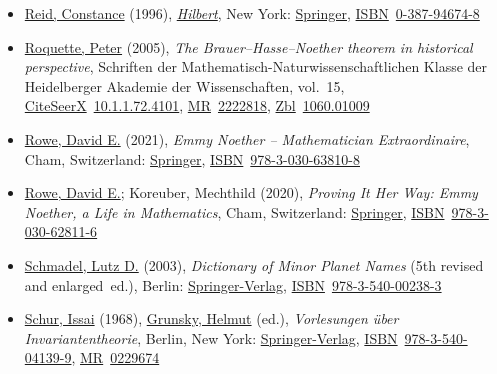 \begin{itemize}
\item
  \href{https://en.wikipedia.org/wiki/Constance_Reid}{Reid, Constance} (1996), \href{https://books.google.com/books?id=mR4SdJGD7tEC}{\emph{Hilbert}}, New York: \href{https://en.wikipedia.org/wiki/Springer_Publishing}{Springer}, \href{https://en.wikipedia.org/wiki/ISBN_(identifier)}{ISBN}{~}\href{https://en.wikipedia.org/wiki/Special:BookSources/0-387-94674-8}{0-387-94674-8}{}
\item
  \href{https://en.wikipedia.org/wiki/Peter_Roquette}{Roquette, Peter} (2005), \emph{The Brauer--Hasse--Noether theorem in historical perspective}, Schriften der Mathematisch-Naturwissenschaftlichen Klasse der Heidelberger Akademie der Wissenschaften, vol.{~}15, \href{https://en.wikipedia.org/wiki/CiteSeerX_(identifier)}{CiteSeerX}{~}{\href{https://citeseerx.ist.psu.edu/viewdoc/summary?doi=10.1.1.72.4101}{10.1.1.72.4101}}, \href{https://en.wikipedia.org/wiki/MR_(identifier)}{MR}{~}\href{https://mathscinet.ams.org/mathscinet-getitem?mr=2222818}{2222818}, \href{https://en.wikipedia.org/wiki/Zbl_(identifier)}{Zbl}{~}\href{https://zbmath.org/?format=complete&q=an:1060.01009}{1060.01009}{}
\item
  \href{https://en.wikipedia.org/wiki/David_E._Rowe}{Rowe, David E.} (2021), \emph{Emmy Noether -- Mathematician Extraordinaire}, Cham, Switzerland: \href{https://en.wikipedia.org/wiki/Springer_Science+Business_Media}{Springer}, \href{https://en.wikipedia.org/wiki/ISBN_(identifier)}{ISBN}{~}\href{https://en.wikipedia.org/wiki/Special:BookSources/978-3-030-63810-8}{978-3-030-63810-8}{}
\item
  \href{https://en.wikipedia.org/wiki/David_E._Rowe}{Rowe, David E.}; Koreuber, Mechthild (2020), \emph{Proving It Her Way: Emmy Noether, a Life in Mathematics}, Cham, Switzerland: \href{https://en.wikipedia.org/wiki/Springer_Science+Business_Media}{Springer}, \href{https://en.wikipedia.org/wiki/ISBN_(identifier)}{ISBN}{~}\href{https://en.wikipedia.org/wiki/Special:BookSources/978-3-030-62811-6}{978-3-030-62811-6}{}
\item
  \href{https://en.wikipedia.org/wiki/Lutz_D._Schmadel}{Schmadel, Lutz D.} (2003), \emph{Dictionary of Minor Planet Names} (5th revised and enlarged{~}ed.), Berlin: \href{https://en.wikipedia.org/wiki/Springer-Verlag}{Springer-Verlag}, \href{https://en.wikipedia.org/wiki/ISBN_(identifier)}{ISBN}{~}\href{https://en.wikipedia.org/wiki/Special:BookSources/978-3-540-00238-3}{978-3-540-00238-3}{}
\item
  \href{https://en.wikipedia.org/wiki/Issai_Schur}{Schur, Issai} (1968), \href{https://en.wikipedia.org/wiki/Helmut_Grunsky}{Grunsky, Helmut} (ed.), \emph{Vorlesungen über Invariantentheorie}, Berlin, New York: \href{https://en.wikipedia.org/wiki/Springer-Verlag}{Springer-Verlag}, \href{https://en.wikipedia.org/wiki/ISBN_(identifier)}{ISBN}{~}\href{https://en.wikipedia.org/wiki/Special:BookSources/978-3-540-04139-9}{978-3-540-04139-9}, \href{https://en.wikipedia.org/wiki/MR_(identifier)}{MR}{~}\href{https://mathscinet.ams.org/mathscinet-getitem?mr=0229674}{0229674}{}

\end{itemize}
